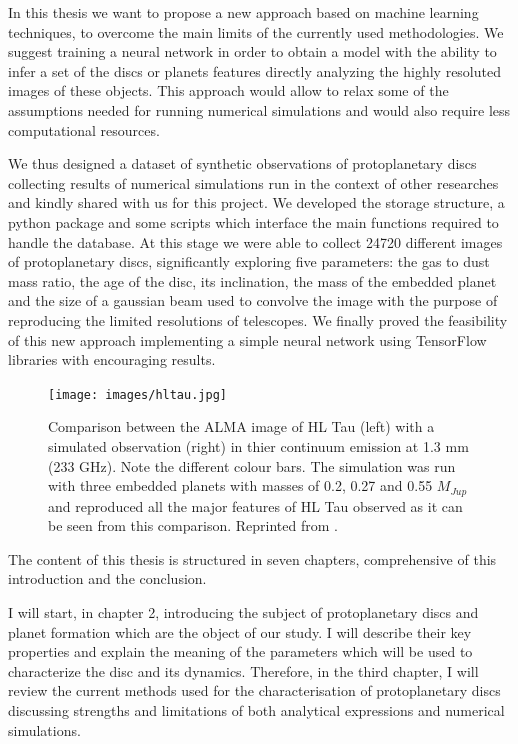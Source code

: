 \documentclass[a4paper,10pt]{report}
\begin{document}
In this thesis we want to propose a new approach based on machine learning techniques, to overcome 
the main limits of the currently used methodologies. We suggest training a neural network
in order to obtain a model with the ability to infer a set of the discs or planets features directly
analyzing the highly resoluted images of these objects. This approach would allow 
to relax some of the assumptions needed for running numerical simulations and would also require 
less computational resources.

We thus designed a dataset of synthetic observations of protoplanetary discs collecting
results of numerical simulations run in the context of other researches and kindly shared with us
for this project. We developed the storage structure, a python package and some scripts which interface 
the main functions required to handle the database. At this stage we were able to collect 24720 different images 
of protoplanetary discs, significantly exploring five parameters: the gas to dust mass ratio, the age of the disc, its inclination, the mass of
the embedded planet and the size of a 
gaussian beam used to convolve the image with the purpose of reproducing the limited resolutions
of telescopes.
We finally proved the feasibility of this new approach implementing 
a simple neural network using TensorFlow libraries with encouraging results.

\begin{figure}
    \begin{center}
        \texttt{[image: images/hltau.jpg]}
    \end{center}
    \caption{Comparison between the ALMA image of HL Tau (left) with a simulated observation (right)
    in thier continuum emission at 1.3 mm (233 GHz). Note the different colour bars.
    The simulation was run with three embedded planets with masses of 0.2, 0.27 and 0.55 $M_{Jup}$ 
    and reproduced all the major features of HL Tau observed as it can be seen from this comparison.
    Reprinted from \citet{Dipierro_2015}.}
\end{figure}

The content of this thesis is structured in seven chapters, comprehensive of this introduction and
the conclusion.

I will start, in chapter 2, introducing the subject of protoplanetary discs and planet formation which 
are the object of our study. I will describe their key properties and explain the meaning of the parameters 
which will be used to characterize the disc and its dynamics. Therefore, in the third chapter, I will review the current 
methods used for the characterisation of protoplanetary discs discussing strengths and limitations
of both analytical expressions and numerical simulations.
\end{document}
